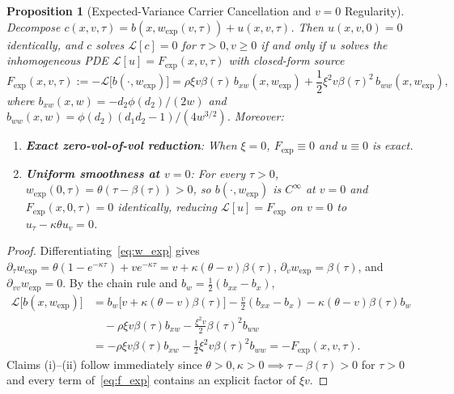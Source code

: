 \documentclass[11pt,a4paper]{article}
\newtheorem{proposition}{Proposition}
\begin{document}
\begin{proposition}[Expected-Variance Carrier Cancellation and $v = 0$ Regularity]
\label{prop:const}
Decompose $c(x, v, \tau) = b(x, w_{\mathrm{exp}}(v, \tau)) + u(x, v, \tau)$. Then $u(x, v, 0) = 0$ identically, and $c$ solves $\mathcal{L}[c] = 0$ for $\tau > 0, v \ge 0$ if and only if $u$ solves the inhomogeneous PDE $\mathcal{L}[u] = F_{\mathrm{exp}}(x, v, \tau)$ with closed-form source
\begin{equation}
  F_{\mathrm{exp}}(x, v, \tau) := -\mathcal{L}\big[b(\cdot, w_{\mathrm{exp}})\big] = \rho\xi v\beta(\tau)\,b_{xw}(x, w_{\mathrm{exp}}) + \frac{1}{2}\xi^2 v\beta(\tau)^2\,b_{ww}(x, w_{\mathrm{exp}}),
  \label{eq:f_exp}
\end{equation}
where $b_{xw}(x,w) = -d_2 \phi(d_2)/(2w)$ and $b_{ww}(x,w) = \phi(d_2)(d_1 d_2 - 1)/(4 w^{3/2})$. Moreover:
\begin{enumerate}
  \item[(i)] \textbf{Exact zero-vol-of-vol reduction}: When $\xi = 0$, $F_{\mathrm{exp}} \equiv 0$ and $u \equiv 0$ is exact.
  \item[(ii)] \textbf{Uniform smoothness at $v = 0$}: For every $\tau > 0$, $w_{\mathrm{exp}}(0, \tau) = \theta(\tau - \beta(\tau)) > 0$, so $b(\cdot, w_{\mathrm{exp}})$ is $C^\infty$ at $v = 0$ and $F_{\mathrm{exp}}(x, 0, \tau) = 0$ identically, reducing $\mathcal{L}[u] = F_{\mathrm{exp}}$ on $v = 0$ to $u_\tau - \kappa\theta u_v = 0$.
\end{enumerate}
\end{proposition}
\begin{proof}
Differentiating~\eqref{eq:w_exp} gives $\partial_\tau w_{\mathrm{exp}} = \theta(1 - e^{-\kappa\tau}) + v e^{-\kappa\tau} = v + \kappa(\theta - v)\beta(\tau)$, $\partial_v w_{\mathrm{exp}} = \beta(\tau)$, and $\partial_{vv} w_{\mathrm{exp}} = 0$. By the chain rule and $b_w = \frac{1}{2}(b_{xx} - b_x)$,
\begin{align*}
  \mathcal{L}\big[b(x, w_{\mathrm{exp}})\big]
  &= b_w \big[v + \kappa(\theta - v)\beta(\tau)\big] - \frac{v}{2}(b_{xx} - b_x) - \kappa(\theta - v)\beta(\tau) b_w \\
  &\quad - \rho\xi v\beta(\tau) b_{xw} - \frac{\xi^2 v}{2}\beta(\tau)^2 b_{ww} \\
  &= -\rho\xi v\beta(\tau) b_{xw} - \frac{1}{2}\xi^2 v\beta(\tau)^2 b_{ww} = -F_{\mathrm{exp}}(x, v, \tau).
\end{align*}
Claims (i)--(ii) follow immediately since $\theta > 0, \kappa > 0 \implies \tau - \beta(\tau) > 0$ for $\tau > 0$ and every term of~\eqref{eq:f_exp} contains an explicit factor of $\xi v$.
\end{proof}
\end{document}
